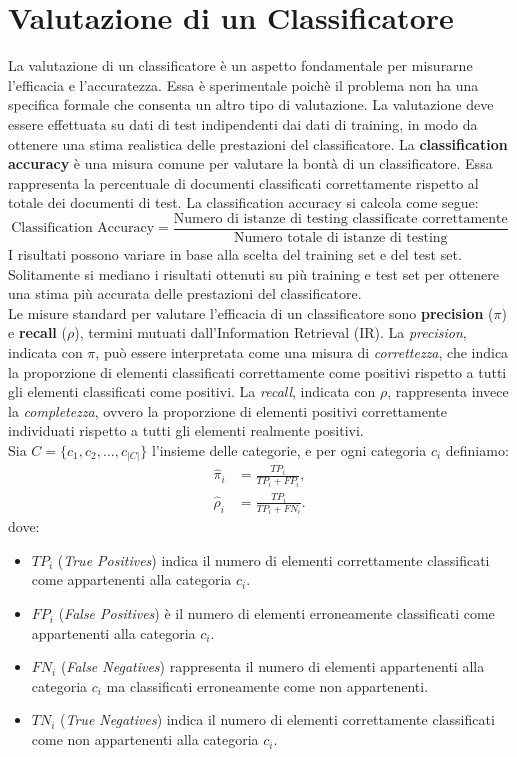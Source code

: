\documentclass{report}
\begin{document}
	\section{Valutazione di un Classificatore}
	La valutazione di un classificatore è un aspetto fondamentale per misurarne l'efficacia e l'accuratezza. Essa è sperimentale poichè il problema non ha una specifica formale che consenta un altro tipo di valutazione. La valutazione deve essere effettuata su dati di test indipendenti dai dati di training, in modo da ottenere una stima realistica delle prestazioni del classificatore. La \textbf{classification accuracy} è una misura comune per valutare la bontà di un classificatore. Essa rappresenta la percentuale di documenti classificati correttamente rispetto al totale dei documenti di test. La classification accuracy si calcola come segue:
	\[
		\text{Classification Accuracy} = \frac{\text{Numero di istanze di testing classificate correttamente}}{\text{Numero totale di istanze di testing}}
	\]
	I risultati possono variare in base alla scelta del training set e del test set. Solitamente si mediano i risultati ottenuti su più training e test set per ottenere una stima più accurata delle prestazioni del classificatore.
	\vspace{\baselineskip}\\
	Le misure standard per valutare l'efficacia di un classificatore sono \textbf{precision} ($\pi$) e \textbf{recall} ($\rho$), termini mutuati dall'Information Retrieval (IR). La \textit{precision}, indicata con $\pi$, può essere interpretata come una misura di \textit{correttezza}, che indica la proporzione di elementi classificati correttamente come positivi rispetto a tutti gli elementi classificati come positivi. La \textit{recall}, indicata con $\rho$, rappresenta invece la \textit{completezza}, ovvero la proporzione di elementi positivi correttamente individuati rispetto a tutti gli elementi realmente positivi.
	\vspace{\baselineskip}\\
	Sia $C = \{c_1, c_2, \dots, c_{|C|}\}$ l'insieme delle categorie, e per ogni categoria $c_i$ definiamo:
	\begin{align*}
		\hat{\pi}_i &= \frac{TP_i}{TP_i + FP_i}, \\
		\hat{\rho}_i &= \frac{TP_i}{TP_i + FN_i}.
	\end{align*}
	dove:
	\begin{itemize}
		\item $TP_i$ (\textit{True Positives}) indica il numero di elementi correttamente classificati come appartenenti alla categoria $c_i$.
		\item $FP_i$ (\textit{False Positives}) è il numero di elementi erroneamente classificati come appartenenti alla categoria $c_i$.
		\item $FN_i$ (\textit{False Negatives}) rappresenta il numero di elementi appartenenti alla categoria $c_i$ ma classificati erroneamente come non appartenenti.
		\item $TN_i$ (\textit{True Negatives}) indica il numero di elementi correttamente classificati come non appartenenti alla categoria $c_i$.
	\end{itemize}
\end{document}
